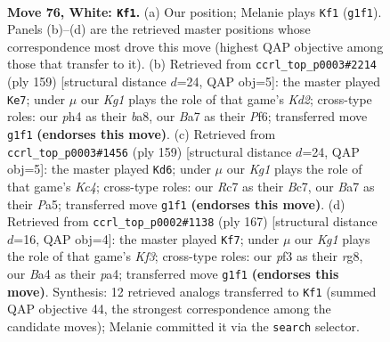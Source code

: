 \documentclass[11pt]{article}
\begin{document}
\clearpage

\begin{figure}[p]\centering
\begin{subfigure}{0.46\textwidth}\centering
\resizebox{\linewidth}{!}{%
\newchessgame
\chessboard[
  setfen={7k/B1R5/4r3/8/B3p2p/5p1P/b4P2/6K1 w - - 62 76},
  showmover=false,
  pgfstyle=straightmove, color=movearrow, markmove={g1-f1}
]}
\caption{}
\end{subfigure}\hfill
\begin{subfigure}{0.46\textwidth}\centering
\resizebox{\linewidth}{!}{%
\newchessgame
\chessboard[
  setfen={B7/3k4/3p1p1K/p4P2/4P3/1Pb5/P7/8 b - - 54 80},
  showmover=false,
  pgfstyle=straightmove, color=movearrow, markmove={d7-e7}
]}
\caption{}
\end{subfigure}
\\[4pt]
\begin{subfigure}{0.46\textwidth}\centering
\resizebox{\linewidth}{!}{%
\newchessgame
\chessboard[
  setfen={4B3/2b5/8/p1k2K2/P2p4/3P4/2P5/8 b - - 22 80},
  showmover=false,
  pgfstyle=straightmove, color=movearrow, markmove={c5-d6}
]}
\caption{}
\end{subfigure}\hfill
\begin{subfigure}{0.46\textwidth}\centering
\resizebox{\linewidth}{!}{%
\newchessgame
\chessboard[
  setfen={6R1/8/1K3k2/p4p2/Pb1r4/5B1P/6P1/8 b - - 70 84},
  showmover=false,
  pgfstyle=straightmove, color=movearrow, markmove={f6-f7}
]}
\caption{}
\end{subfigure}
\caption{\textbf{Move 76, White: \texttt{Kf1}.} (a) Our position; Melanie plays \texttt{Kf1} (\texttt{g1f1}). Panels (b)--(d) are the retrieved master positions whose correspondence most drove this move (highest QAP objective among those that transfer to it). (b) Retrieved from \texttt{ccrl\_top\_p0003\#2214} (ply 159) [structural distance $d$=24, QAP obj=5]: the master played \texttt{Ke7}; under $\mu$ our \emph{Kg1} plays the role of that game's \emph{Kd2}; cross-type roles: our \emph{p}h4 as their \emph{b}a8, our \emph{B}a7 as their \emph{P}f6; transferred move \texttt{g1f1} \textbf{(endorses this move)}. (c) Retrieved from \texttt{ccrl\_top\_p0003\#1456} (ply 159) [structural distance $d$=24, QAP obj=5]: the master played \texttt{Kd6}; under $\mu$ our \emph{Kg1} plays the role of that game's \emph{Kc4}; cross-type roles: our \emph{R}c7 as their \emph{B}c7, our \emph{B}a7 as their \emph{P}a5; transferred move \texttt{g1f1} \textbf{(endorses this move)}. (d) Retrieved from \texttt{ccrl\_top\_p0002\#1138} (ply 167) [structural distance $d$=16, QAP obj=4]: the master played \texttt{Kf7}; under $\mu$ our \emph{Kg1} plays the role of that game's \emph{Kf3}; cross-type roles: our \emph{p}f3 as their \emph{r}g8, our \emph{B}a4 as their \emph{p}a4; transferred move \texttt{g1f1} \textbf{(endorses this move)}. Synthesis: 12 retrieved analogs transferred to \texttt{Kf1} (summed QAP objective 44, the strongest correspondence among the candidate moves); Melanie committed it via the \texttt{search} selector.}
\label{fig:thought-m150}
\end{figure}
\end{document}
